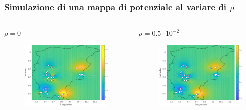 \begin{frame}
	\frametitle{Simulazione di una mappa di potenziale al variare di $\rho$}
	
	\begin{columns}[T]
		\begin{column}[t]{0.5\linewidth}
			\centering
			$\rho = 0$
			\begin{figure}
				\includegraphics[width=\textwidth]{../Tesi/Immagini/2. Nuovo modello/Mappa potenziale, rho = 0}
			\end{figure}
		\end{column}
		\begin{column}[t]{0.5\linewidth}
			\centering
			$\rho = 0.5\cdot 10^{-2}$
			\begin{figure}
				\includegraphics[width=\textwidth]{../Tesi/Immagini/2. Nuovo modello/Mappa potenziale, rho = 0.005}
			\end{figure}
		\end{column}
	\end{columns}

\end{frame}

